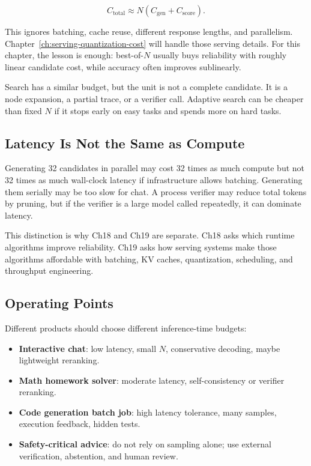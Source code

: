\begin{equation}
  C_{\text{total}} \approx N(C_{\text{gen}} + C_{\text{score}}).
  \label{eq:bestofn-cost}
\end{equation}

This ignores batching, cache reuse, different response lengths, and parallelism. Chapter~\ref{ch:serving-quantization-cost} will handle those serving details. For this chapter, the lesson is enough: best-of-$N$ usually buys reliability with roughly linear candidate cost, while accuracy often improves sublinearly.

Search has a similar budget, but the unit is not a complete candidate. It is a node expansion, a partial trace, or a verifier call. Adaptive search can be cheaper than fixed $N$ if it stops early on easy tasks and spends more on hard tasks.

\subsection{Latency Is Not the Same as Compute}

Generating 32 candidates in parallel may cost 32 times as much compute but not 32 times as much wall-clock latency if infrastructure allows batching. Generating them serially may be too slow for chat. A process verifier may reduce total tokens by pruning, but if the verifier is a large model called repeatedly, it can dominate latency.

This distinction is why Ch18 and Ch19 are separate. Ch18 asks which runtime algorithms improve reliability. Ch19 asks how serving systems make those algorithms affordable with batching, KV caches, quantization, scheduling, and throughput engineering.

\subsection{Operating Points}

Different products should choose different inference-time budgets:

\begin{itemize}[nosep]
  \item \textbf{Interactive chat}: low latency, small $N$, conservative decoding, maybe lightweight reranking.
  \item \textbf{Math homework solver}: moderate latency, self-consistency or verifier reranking.
  \item \textbf{Code generation batch job}: high latency tolerance, many samples, execution feedback, hidden tests.
  \item \textbf{Safety-critical advice}: do not rely on sampling alone; use external verification, abstention, and human review.
\end{itemize}

